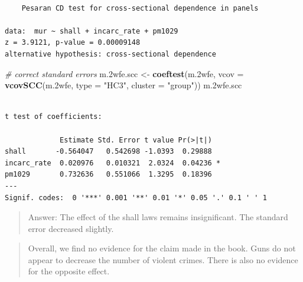 \documentclass[]{article}
\newenvironment{Shaded}{\begin{snugshade}}{\end{snugshade}}
\newcommand{\KeywordTok}[1]{\textcolor[rgb]{0.13,0.29,0.53}{\textbf{#1}}}
\newcommand{\DataTypeTok}[1]{\textcolor[rgb]{0.13,0.29,0.53}{#1}}
\newcommand{\StringTok}[1]{\textcolor[rgb]{0.31,0.60,0.02}{#1}}
\newcommand{\CommentTok}[1]{\textcolor[rgb]{0.56,0.35,0.01}{\textit{#1}}}
\newcommand{\NormalTok}[1]{#1}
\theoremstyle{definition}
\theoremstyle{definition}
\theoremstyle{definition}
\theoremstyle{remark}
\begin{document}
\begin{verbatim}

    Pesaran CD test for cross-sectional dependence in panels

data:  mur ~ shall + incarc_rate + pm1029
z = 3.9121, p-value = 0.00009148
alternative hypothesis: cross-sectional dependence
\end{verbatim}

\begin{Shaded}
\begin{Highlighting}[]
\CommentTok{# correct standard errors}
\NormalTok{m.2wfe.scc <-}\StringTok{ }\KeywordTok{coeftest}\NormalTok{(m.2wfe, }\DataTypeTok{vcov =} \KeywordTok{vcovSCC}\NormalTok{(m.2wfe, }\DataTypeTok{type =} \StringTok{"HC3"}\NormalTok{, }\DataTypeTok{cluster =} \StringTok{"group"}\NormalTok{))}
\NormalTok{m.2wfe.scc}
\end{Highlighting}
\end{Shaded}

\begin{verbatim}

t test of coefficients:

             Estimate Std. Error t value Pr(>|t|)  
shall       -0.564047   0.542698 -1.0393  0.29888  
incarc_rate  0.020976   0.010321  2.0324  0.04236 *
pm1029       0.732636   0.551066  1.3295  0.18396  
---
Signif. codes:  0 '***' 0.001 '**' 0.01 '*' 0.05 '.' 0.1 ' ' 1
\end{verbatim}

\begin{quote}
Answer: The effect of the shall laws remains insignificant. The standard
error decreased slightly.
\end{quote}

\begin{quote}
Overall, we find no evidence for the claim made in the book. Guns do not
appear to decrease the number of violent crimes. There is also no
evidence for the opposite effect.
\end{quote}
\end{document}
